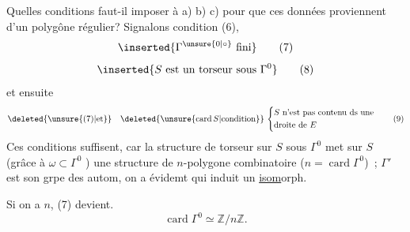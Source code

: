 Quelles conditions faut-il imposer à a) b) c)
pour que ces données proviennent d'un
polygône régulier? Signalons condition (6),
\[
\inserted{\Gamma^{\unsure{0|\circ}}\ \text{fini}}\tag*{(7)}
\]
\[
\inserted{S\ \text{est un torseur sous }\Gamma^0}\tag*{(8)}
\]
et ensuite
\[
\deleted{\unsure{(7)|\text{et}}}\quad
\deleted{\unsure{\operatorname{card} S|\text{condition}}}\,
\left\{\begin{aligned}&S\ \text{n'est pas contenu ds une}\\&\text{droite de }E\end{aligned}\right.
\tag*{(9)}
\]
Ces   conditions  suffisent, car la
structure de torseur sur $S$ sous $\Gamma^0$
met sur $S$ (grâce à $\omega\subset\Gamma^0$ ) une
structure de $n$-polygone combinatoire
($n=\operatorname{card}\Gamma^0$) \,;
$\Gamma'$ est son grpe des autom, on a évidemt
qui induit un \uline{isom}orph.

Si on a  $n$, (7) devient.
\[
\operatorname{card}\Gamma^0\simeq\mathbb{Z}/n\mathbb{Z}.\tag*{$(7')$}
\]

